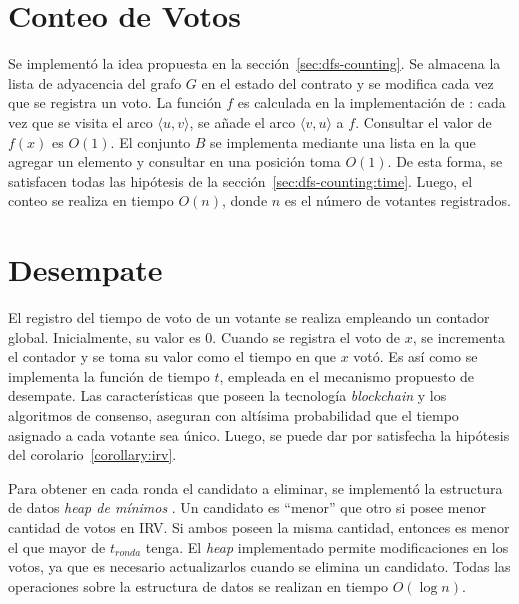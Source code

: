 \section{Conteo de Votos}\label{sec:implementation:counting}
Se implement\'o la idea propuesta en la secci\'on~\ref{sec:dfs-counting}. Se almacena la lista de adyacencia del grafo $G$ en el estado del contrato y se modifica cada vez que se registra un voto. La funci\'on $f$ es calculada en la implementaci\'on de \dfsvisitcaption: cada vez que se visita el arco $\langle u, v \rangle$, se a\~nade el arco $\langle v, u \rangle$ a $f$. Consultar el valor de $f(x)$ es $O(1)$. El conjunto $B$ se implementa mediante una lista en la que agregar un elemento y consultar en una posici\'on toma $O(1)$. De esta forma, se satisfacen todas las hip\'otesis de la secci\'on~\ref{sec:dfs-counting:time}. Luego, el conteo se realiza en tiempo $O(n)$, donde $n$ es el n\'umero de votantes registrados.

\section{Desempate}\label{sec:implementation:irv}
El registro del tiempo de voto de un votante se realiza empleando un contador global. Inicialmente, su valor es $0$. Cuando se registra el voto de $x$, se incrementa el contador y se toma su valor como el tiempo en que $x$ vot\'o. Es as\'i como se implementa la funci\'on de tiempo $t$, empleada en el mecanismo propuesto de desempate. Las caracter\'isticas que  poseen la tecnolog\'ia \textit{blockchain}  y los algoritmos de consenso, aseguran con alt\'isima probabilidad que el tiempo asignado a cada votante sea \'unico.  Luego, se puede dar por satisfecha la hip\'otesis del corolario~\ref{corollary:irv}.

Para obtener en cada ronda el candidato a eliminar, se implement\'o la estructura de datos \textit{heap de m\'inimos} \citep{intro-to-algo-3}. Un candidato es ``menor'' que otro si posee menor cantidad de votos en IRV. Si ambos poseen la misma cantidad, entonces es menor el que mayor de $t_{ronda}$ tenga. El \textit{heap} implementado permite modificaciones en los votos, ya que es necesario actualizarlos cuando se elimina un candidato. Todas las operaciones sobre la estructura de datos se realizan en tiempo $O(\log n)$.

